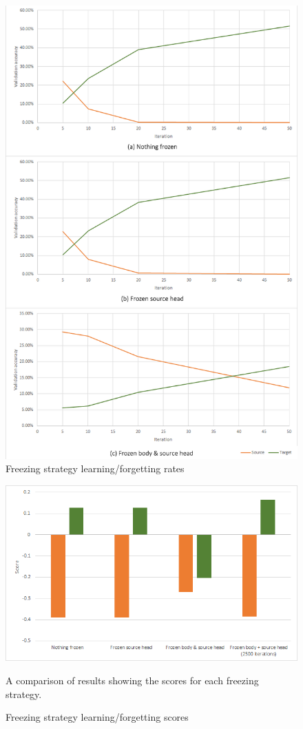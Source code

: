 \documentclass{report}
\begin{document}
	\begin{figure}[h]
		\centering
		\includegraphics[width=12cm]{book}
		\caption{Freezing strategy learning/forgetting rates}
		\label{fig:book:1}
	\end{figure}

	\begin{figure}[h]
		\centering
		\includegraphics[width=12cm]{book2}
		\caption{Freezing strategy learning/forgetting scores}
		A comparison of results showing the scores for each freezing strategy.
		\label{fig:book:2}
	\end{figure}
\end{document}
